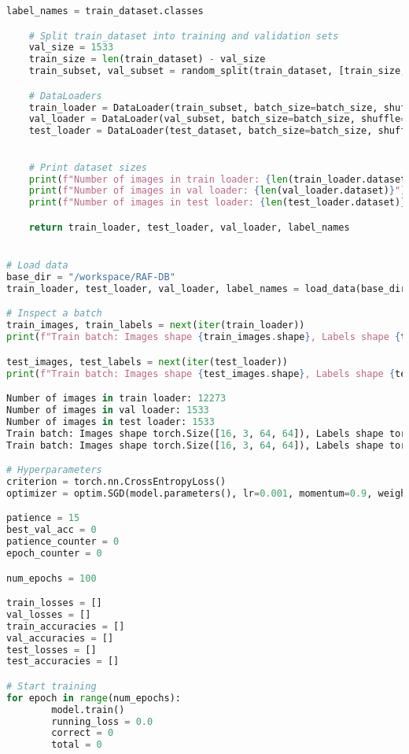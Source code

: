 \begin{lstlisting}[language=Python, caption={Python skript použitý na trenovanie modelu}, label={lst:training}]
    label_names = train_dataset.classes

    # Split train_dataset into training and validation sets
    val_size = 1533
    train_size = len(train_dataset) - val_size
    train_subset, val_subset = random_split(train_dataset, [train_size, val_size])

    # DataLoaders
    train_loader = DataLoader(train_subset, batch_size=batch_size, shuffle=True)
    val_loader = DataLoader(val_subset, batch_size=batch_size, shuffle=False)
    test_loader = DataLoader(test_dataset, batch_size=batch_size, shuffle=False)
    

    # Print dataset sizes
    print(f"Number of images in train loader: {len(train_loader.dataset)}")
    print(f"Number of images in val loader: {len(val_loader.dataset)}")
    print(f"Number of images in test loader: {len(test_loader.dataset)}")

    return train_loader, test_loader, val_loader, label_names


# Load data
base_dir = "/workspace/RAF-DB"
train_loader, test_loader, val_loader, label_names = load_data(base_dir=base_dir, batch_size=16, transform=transform)

# Inspect a batch
train_images, train_labels = next(iter(train_loader))
print(f"Train batch: Images shape {train_images.shape}, Labels shape {train_labels.shape}")

test_images, test_labels = next(iter(test_loader))
print(f"Train batch: Images shape {test_images.shape}, Labels shape {test_labels.shape}")

Number of images in train loader: 12273
Number of images in val loader: 1533
Number of images in test loader: 1533
Train batch: Images shape torch.Size([16, 3, 64, 64]), Labels shape torch.Size([16])
Train batch: Images shape torch.Size([16, 3, 64, 64]), Labels shape torch.Size([16])

# Hyperparameters
criterion = torch.nn.CrossEntropyLoss()
optimizer = optim.SGD(model.parameters(), lr=0.001, momentum=0.9, weight_decay=1e-4)

patience = 15
best_val_acc = 0
patience_counter = 0
epoch_counter = 0

num_epochs = 100

train_losses = []
val_losses = []
train_accuracies = []
val_accuracies = []
test_losses = []
test_accuracies = []

# Start training
for epoch in range(num_epochs):
        model.train()
        running_loss = 0.0
        correct = 0
        total = 0


\end{lstlisting}
